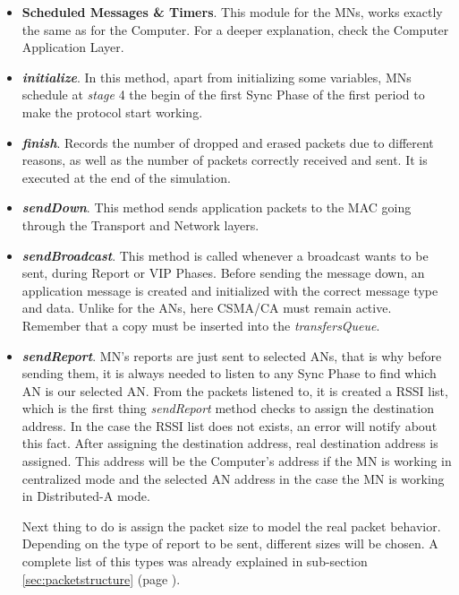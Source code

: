 \begin{itemize}
 \item \textbf{Scheduled Messages \& Timers}. This module for the \acp{MN}, works exactly the same as for the Computer. For a deeper explanation, check
the Computer Application Layer.

 \item \textbf{\textit{initialize}}. In this method, apart from initializing some variables, \acp{MN} schedule at \textit{stage} 4 the begin of 
the first Sync Phase of the first period to make the protocol start working.

 \item \textbf{\textit{finish}}. Records the number of dropped and erased packets due to different reasons, as well as the number of packets
correctly received and sent. It is executed at the end of the simulation.

 \item \textbf{\textit{sendDown}}. This method sends application packets to the \ac{MAC} going through the Transport and Network layers.

 \item \textbf{\textit{sendBroadcast}}. This method is called whenever a broadcast wants to be sent, during Report or \ac{VIP} Phases. Before 
sending the message down, an application message is created and initialized with the correct message type and data. Unlike for the \acp{AN},
here \ac{CSMA/CA} must remain active. Remember that a copy must be inserted into the \textit{transfersQueue}.

 \item \textbf{\textit{sendReport}}. \ac{MN}'s reports are just sent to selected \acp{AN}, that is why before sending them, it is always needed
to listen to any Sync Phase to find which \ac{AN} is our selected \ac{AN}. From the packets listened to, it is created a \ac{RSSI} list, which 
is the first thing \textit{sendReport} method checks to assign the destination address. In the case the \ac{RSSI} list does not exists, an 
error will notify about this fact. After assigning the destination address, real destination address is assigned. This address will be 
the Computer's address if the \ac{MN} is working in centralized mode and the selected \ac{AN} address in the case the \ac{MN} is working in 
Distributed-A mode.

Next thing to do is assign the packet size to model the real packet behavior. Depending on the type of report to be sent, different sizes will 
be chosen. A complete list of this types was already explained in sub-section \ref{sec:packetstructure} (page \pageref{sec:packetstructure}).


\end{itemize}
